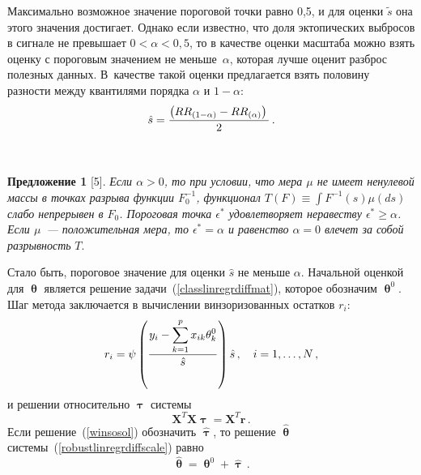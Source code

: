 \begin{multicols}{2}
Максимально возможное значение пороговой точки равно 0,5, и для
оценки $\tilde{s}$ она этого значения достигает. Однако если
известно, что доля эктопических выбросов в сигнале не превышает
$0<\alpha<0{,}5$, то в качестве оценки масштаба можно взять оценку с
пороговым значением не меньше~$\alpha$, которая лучше оценит
разброс полезных данных. В~качестве такой оценки предлагается
взять половину разности между квантилями порядка $\alpha$ и
$1-\alpha$:
\begin{equation*}
\hat{s} =
\displaystyle\frac{\displaystyle \left(RR_{(1-\alpha)}-RR_{(\alpha)}\right)\mathstrut}{\displaystyle 2\mathstrut}\,.
\end{equation*}

\begin{figure*} %
\vspace*{1pt}
\begin{center}
\mbox{%
\epsfxsize=157.775mm
}
\end{center}
\vspace*{-9pt}
\end{figure*}

\medskip

\noindent
{\bf Предложение 1} %
[5]. 
\textit{Если
$\alpha>0$, то при условии, что мера $\mu$ не имеет ненулевой
массы в точках разрыва функции $F_0^{-1}$, функционал
$T(F)\equiv\int F^{-1}(s)\mu(ds)$ слабо непрерывен в $F_0$.
Пороговая точка $\epsilon^*$ удовлетворяет неравеству
$\epsilon^*\geq\alpha$. Если $\mu$~--- положительная мера, то
$\epsilon^*=\alpha$ и равенство $\alpha=0$ влечет за собой
разрывность} $T$. 

Стало быть, пороговое значение
для оценки $\hat{s}$ не меньше $\alpha$. Начальной оценкой для
$\bm{\uptheta}$ является решение задачи~(\ref{classlinregrdiffmat}),
которое обозначим $\bm{\uptheta}^0$.
Шаг метода заключается в вычислении винзоризованных остатков
$r_i$:
\begin{equation*}
r_i =
\psi\left(\displaystyle\frac{\displaystyle y_i - \sum_{k=1}^p
x_{ik}{\theta}^0_k\mathstrut}{\displaystyle \hat{s}\mathstrut}\right)\hat{s}\,, \quad i=1,\ldots,N\,,
\end{equation*}
и решении относительно $\bm{\uptau}$ системы
\begin{equation}
\label{winsosol}
\mathbf{X}^T\mathbf{X}{\bm\uptau}=\mathbf{X}^T\mathbf{r}\,.
\end{equation}
Если решение~(\ref{winsosol}) обозначить
$\hat{\bm{\uptau}}$, то решение $\hat{\bm{\uptheta}}$
сис\-те\-мы~(\ref{robustlinregrdiffscale}) равно
\begin{equation}\label{robustthetasol}
\hat{\bm{\uptheta}} =
\bm{\uptheta}^0 + \hat{\bm{\uptau}}\,.
\end{equation}


\end{multicols}
